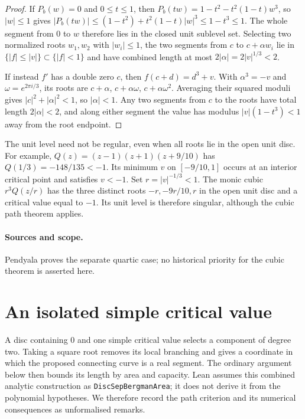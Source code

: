 \documentclass[11pt]{article}
\begin{document}
\begin{proof}
If $P_b(w)=0$ and $0\le t\le1$, then
$P_b(tw)=1-t^2-t^2(1-t)w^3$, so $|w|\le1$ gives
$|P_b(tw)|\le(1-t^2)+t^2(1-t)|w|^3\le1-t^3\le1$.  The whole segment from $0$
to $w$ therefore lies in the closed unit sublevel set.  Selecting two normalized roots $w_1,w_2$ with
$|w_i|\le1$, the two segments from $c$ to $c+\alpha w_i$ lie in
$\{|f|\le|v|\}\subset\{|f|<1\}$ and have combined length at most
$2|\alpha|=2|v|^{1/3}<2$.

If instead $f'$ has a double zero $c$, then $f(c+d)=d^3+v$. With $\alpha^3=-v$ and
$\omega=e^{2\pi i/3}$, its roots are
$c+\alpha$, $c+\alpha\omega$, $c+\alpha\omega^2$.  Averaging their squared
moduli gives $|c|^2+|\alpha|^2<1$, so $|\alpha|<1$. Any two segments from
$c$ to the roots have total length $2|\alpha|<2$, and along either segment
the value has modulus
$|v|(1-t^3)<1$ away from the root endpoint.
\end{proof}

The unit level need not be regular, even when all roots lie in the open
unit disc. For example,
$Q(z)=(z-1)(z+1)(z+9/10)$ has $Q(1/3)=-148/135<-1$.
Its minimum $v$ on $[-9/10,1]$ occurs at an interior critical point and
satisfies $v<-1$. Set $r=|v|^{-1/3}<1$. The monic cubic
$r^3Q(z/r)$ has the three distinct roots $-r,-9r/10,r$ in the open unit
disc and a critical value equal to $-1$. Its unit level is therefore
singular, although the cubic path theorem applies.

\paragraph{Sources and scope.}
\label{bdry:degree-three}
Pendyala \cite[Theorem~1, pp.~1--3]{june2026} proves the separate quartic
case; no historical priority for the cubic theorem is asserted here.

\section{An isolated simple critical value}
\label{sec:critical-value-separation}

A disc containing $0$ and one simple critical value selects a component
of degree two. Taking a square root removes its local branching and
gives a coordinate in which the proposed connecting curve is a real
segment. The ordinary argument
below then bounds its length by area and capacity. Lean assumes this
combined analytic construction as \texttt{DiscSepBergmanArea}; it does
not derive it from the polynomial hypotheses. We therefore record the
path criterion and its numerical consequences as unformalised remarks.
\end{document}
